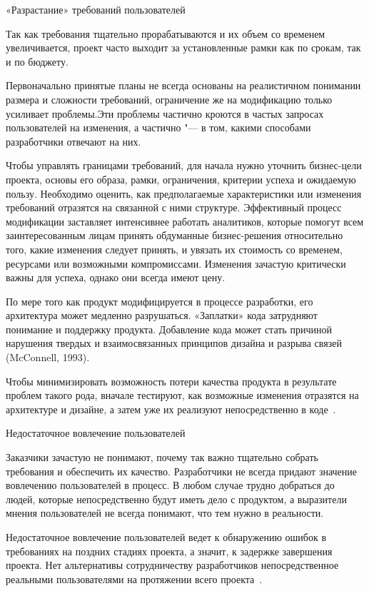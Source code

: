 \documentclass{../industrial-development}
\begin{document}
{\alert{«Разрастание» требований пользователей}

Так как требования тщательно прорабатываются и их объем со временем увеличивается, проект часто выходит за установленные рамки как по срокам, так и по бюджету. 

Первоначально принятые планы не всегда основаны на реалистичном понимании размера и сложности требований, ограничение же на модификацию только усиливает проблемы.Эти проблемы частично кроются в частых запросах пользователей на изменения, а частично "--- в том, какими способами разработчики отвечают на них.

Чтобы управлять границами требований, для начала нужно уточнить бизнес-цели проекта, основы его образа, рамки, ограничения, критерии успеха и ожидаемую пользу. Необходимо оценить, как предполагаемые характеристики или изменения требований отразятся на связанной с ними структуре. Эффективный процесс модификации заставляет интенсивнее работать аналитиков, которые помогут всем заинтересованным
лицам принять обдуманные бизнес-решения относительно того, какие изменения следует принять, и увязать их стоимость со временем, ресурсами или возможными компромиссами. Изменения зачастую критически важны для успеха, однако они всегда имеют цену.

По мере того как продукт модифицируется в процессе разработки, его архитектура может медленно разрушаться. «Заплатки» кода затрудняют понимание и поддержку продукта. Добавление кода может стать причиной нарушения твердых и взаимосвязанных принципов дизайна и разрыва связей (McConnell, 1993). 

Чтобы минимизировать возможность потери качества продукта в результате проблем такого рода, вначале тестируют, как возможные изменения отразятся на архитектуре и дизайне, а затем уже их реализуют непосредственно в коде~\cite[с.~17--18]{Wiegers}.

\alert{Недостаточное вовлечение пользователей}

Заказчики зачастую не понимают, почему так важно тщательно собрать требования и обеспечить их качество. Разработчики не всегда придают значение вовлечению пользователей в процесс. В любом случае трудно добраться до людей, которые непосредственно будут иметь дело с продуктом, а выразители мнения пользователей не всегда понимают, что тем нужно в реальности. 

Недостаточное вовлечение пользователей ведет к обнаружению ошибок в требованиях на поздних стадиях проекта, а значит, к задержке завершения проекта. Нет альтернативы сотрудничеству разработчиков непосредственное реальными пользователями на протяжении всего проекта~\cite[с.~17]{Wiegers}.


}
\end{document}
